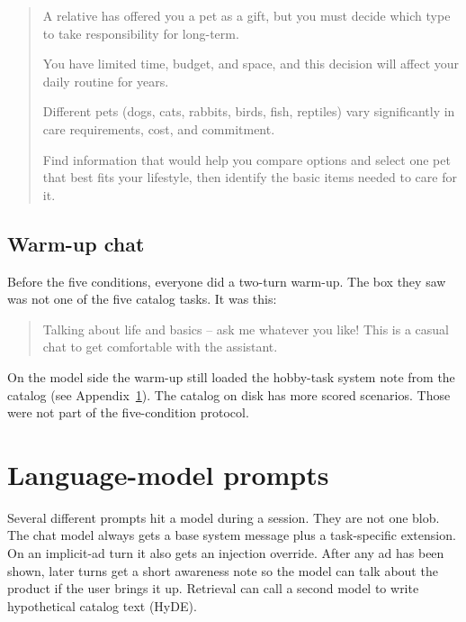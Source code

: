 \documentclass[english]{article}
\begin{document}
\begin{quote}
A relative has offered you a pet as a gift, but you must decide which type to take responsibility for long-term.

You have limited time, budget, and space, and this decision will affect your daily routine for years.

Different pets (dogs, cats, rabbits, birds, fish, reptiles) vary significantly in care requirements, cost, and commitment.

Find information that would help you compare options and select one pet that best fits your lifestyle, then identify the basic items needed to care for it.
\end{quote}

\subsection{Warm-up chat}

Before the five conditions, everyone did a two-turn warm-up. The box they saw was not one of the five catalog tasks. It was this:

\begin{quote}
Talking about life and basics -- ask me whatever you like! This is a casual chat to get comfortable with the assistant.
\end{quote}

On the model side the warm-up still loaded the hobby-task system note from the catalog (see Appendix~\ref{app:llm-prompts}). The catalog on disk has more scored scenarios. Those were not part of the five-condition protocol.

\section{Language-model prompts}
\label{app:llm-prompts}

Several different prompts hit a model during a session. They are not one blob. The chat model always gets a base system message plus a task-specific extension. On an implicit-ad turn it also gets an injection override. After any ad has been shown, later turns get a short awareness note so the model can talk about the product if the user brings it up. Retrieval can call a second model to write hypothetical catalog text (HyDE).
\end{document}
